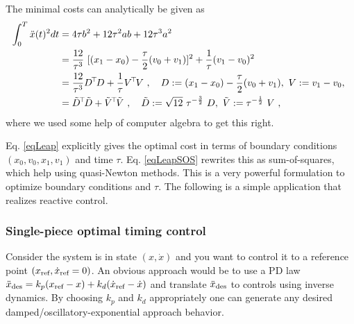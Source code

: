 The minimal costs can analytically be given as
\begin{align}
\int_0^T \ddot x(t)^2 dt
&= 4 \tau b^2  + 12 \tau^2 ab + 12 \tau^3 a^2 \\
&= \frac{12}{\tau^3}~[(x_1 - x_0)-\frac{\tau}{2}(v_0+v_1)]^2+\frac{1}{\tau}(v_1-v_0)^2 \label{eqLeap}\\
&= \frac{12}{\tau^3} D^\T D + \frac{1}{\tau} V^\T V \comma D := (x_1 - x_0)-\frac{\tau}{2}(v_0+v_1),~ V:=v_1-v_0,~ \\
&= \tilde D^\T \tilde D + \tilde V^\T \tilde V \comma
\tilde D := \sqrt{12}~ \tau^{-\frac{3}{2}}~ D,~ \tilde V := \tau^{-\half}~ V ~,
\label{eqLeapSOS}
\end{align}
where we used some help of computer algebra to get this right.

Eq. \eqref{eqLeap} explicitly gives the optimal cost in terms of
boundary conditions $(x_0,v_0,x_1,v_1)$ and time $\tau$.
Eq. \eqref{eqLeapSOS} rewrites this as sum-of-squares, which help
using quasi-Newton methods. This is a very powerful formulation to
optimize boundary conditions and $\tau$. The following is a simple
application that realizes reactive control.

\subsubsection{Single-piece optimal timing control}

Consider the system is in state $(x,\dot x)$ and you want to control
it to a reference point $(x_{\text{ref}}, \dot x_{\text{ref}}=0)$. An obvious approach
would be to use a PD law $\ddot x_{\text{des}} = k_p (x_{\text{ref}} - x) + k_d (\dot
x_{\text{ref}} - \dot x)$ and translate $\ddot x_{\text{des}}$ to controls using
inverse dynamics. By choosing $k_p$ and $k_d$ appropriately one can
generate any desired damped/oscillatory-exponential approach behavior.

